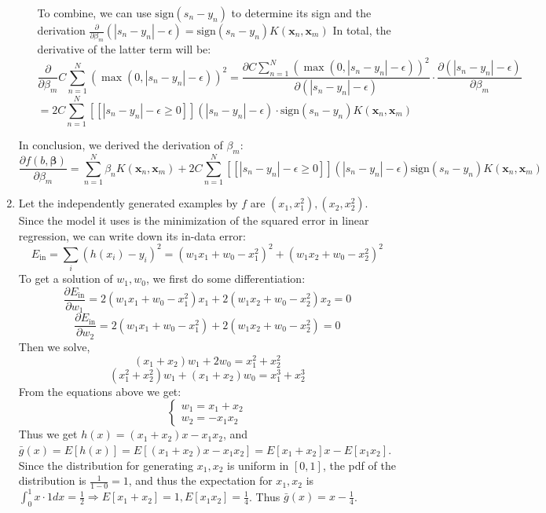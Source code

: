 \documentclass[11pt]{article}
\begin{document}
\begin{enumerate}[label=\textbf{\arabic*}.]
\begin{enumerate}
\begin{itemize}
    \end{itemize}
    To combine, we can use $\text{sign}(s_n-y_n) $ to determine its sign and the derivation $\frac{\partial}{\partial \beta_m} (|s_n -y_n|-\epsilon) = \text{sign}(s_n-y_n) K(\mathbf{x}_n, \mathbf{x}_m)$
    In total, the derivative of the latter term will be: 
    \[\frac{\partial}{\partial \beta_m} C \sum_{n=1}^N \left(\max \left(0, |s_n -y_n|-\epsilon \right) \right)^2 = \frac{\partial C \sum_{n=1}^N \left(\max \left(0, |s_n -y_n|-\epsilon \right) \right)^2}{\partial (|s_n -y_n|-\epsilon)}  \cdot \frac{\partial (|s_n -y_n|-\epsilon)}{\partial \beta_m}\]
    \[= 2C \sum_{n=1}^N [\![|s_n-y_n| - \epsilon \geq 0]\!](|s_n -y_n|-\epsilon)\cdot \text{sign}(s_n-y_n) K(\mathbf{x}_n, \mathbf{x}_m)\]
  \end{enumerate}
  In conclusion, we derived the derivation of $\beta_m$:
  \[\frac{\partial f(b, \bm{\beta})}{\partial \beta_m} = \sum_{n=1}^N \beta_{n} K(\mathbf{x}_n, \mathbf{x}_m) + 2C \sum_{n=1}^N [\![|s_n-y_n| - \epsilon \geq 0]\!](|s_n -y_n|-\epsilon) \text{sign}(s_n-y_n) K(\mathbf{x}_n, \mathbf{x}_m)\]


  \item Let the independently generated examples by $f$ are $(x_1, x_1^2), (x_2, x_2^2)$. Since the model it uses is the minimization of the squared error in linear regression, we can write down its in-data error:
    \[E_{\text{in}} = \sum_{i}  (h(x_i) - y_i)^2 = (w_1x_1+w_0-x_1^2)^2+(w_1x_2+w_0-x_2^2)^2\]
    To get a solution of $w_1, w_0$, we first do some differentiation:
    \[\frac{\partial E_{\text{in}}}{\partial w_1} = 2(w_1x_1+w_0-x_1^2)x_1+2(w_1x_2+w_0-x_2^2)x_2=0\]
    \[\frac{\partial E_{\text{in}}}{\partial w_2} = 2(w_1x_1+w_0-x_1^2)+2(w_1x_2+w_0-x_2^2)=0\]
    Then we solve, 
    \[(x_1+x_2)w_1+2w_0=x_1^2+x_2^2\]
    \[(x_1^2+x_2^2)w_1+(x_1+x_2)w_0=x_1^3+x_2^3\]
    From the equations above we get:
    \[\left\{\begin{array}{c} w_1=x_1+x_2 \\ w_2=-x_1x_2 \end{array}\right. \]
    Thus we get $h(x)=(x_1+x_2)x-x_1x_2$, and $\bar{g}(x) = E[h(x)] = E[(x_1+x_2)x-x_1x_2] = E[x_1+x_2]x-E[x_1x_2]$. Since the distribution for generating $x_1, x_2$ is uniform in $[0, 1]$, the pdf of the distribution is $\frac{1}{1-0} = 1$, and thus the expectation for $x_1, x_2$ is $\int_0^1 x\cdot 1 dx=\frac{1}{2} \Rightarrow E[x_1+x_2] = 1, E[x_1x_2]=\frac{1}{4}$. Thus $\bar{g}(x) = x - \frac{1}{4}$.


\end{enumerate}
\end{document}
